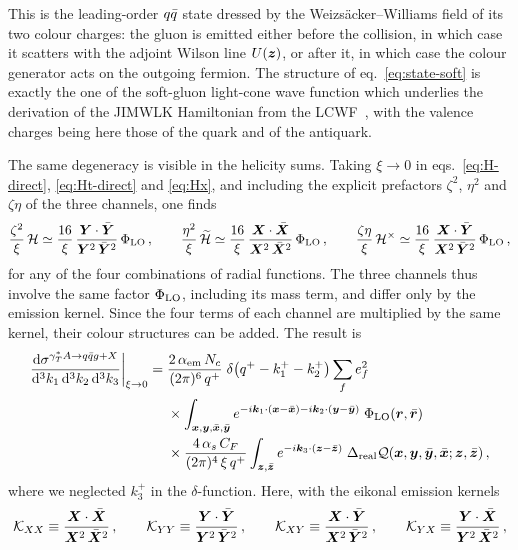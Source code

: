 This is the leading-order $q\bar q$ state dressed by the Weizs\"acker--Williams field of its two colour
charges: the gluon is emitted either before the collision, in which case it scatters with the adjoint
Wilson line $U(\bm{z})$, or after it, in which case the colour generator acts on the outgoing fermion. The
structure of eq.~\eqref{eq:state-soft} is exactly the one of the soft-gluon light-cone wave function
which underlies the derivation of the JIMWLK Hamiltonian from the
LCWF~\cite{Kovner:2000pt,Lublinsky:2016meo,Radhakrishnan:2026}, with the valence charges being here
those of the quark and of the antiquark.

The same degeneracy is visible in the helicity sums. Taking $\xi\to0$ in eqs.~\eqref{eq:H-direct},
\eqref{eq:Ht-direct} and \eqref{eq:Hx}, and including the explicit prefactors $\zeta^2$, $\eta^2$ and
$\zeta\eta$ of the three channels, one finds
\begin{equation}
\frac{\zeta^2}{\xi}\,\mathcal{H}\simeq\frac{16}{\xi}\,\frac{\bm{Y}\cdot\bar{\bm{Y}}}{\bm{Y}^2\,\bar{\bm{Y}}^2}\,\Phi_{\rm LO}\,,\qquad
\frac{\eta^2}{\xi}\,\widetilde{\mathcal{H}}\simeq\frac{16}{\xi}\,\frac{\bm{X}\cdot\bar{\bm{X}}}{\bm{X}^2\,\bar{\bm{X}}^2}\,\Phi_{\rm LO}\,,\qquad
\frac{\zeta\eta}{\xi}\,\mathcal{H}^\times\simeq\frac{16}{\xi}\,\frac{\bm{X}\cdot\bar{\bm{Y}}}{\bm{X}^2\,\bar{\bm{Y}}^2}\,\Phi_{\rm LO}\,,
\label{eq:soft-weights}
\end{equation}
for any of the four combinations of radial functions. The three channels thus involve the same factor
$\Phi_{\rm LO}$, including its mass term, and differ only by the emission kernel. Since the four terms
of each channel are multiplied by the same kernel, their colour structures can be added. The result is
\begin{align}
\frac{{\rm d}\sigma^{\gamma^{*}_{T} A\to q\bar q g+X}}{{\rm d}^3k_1\,{\rm d}^3k_2\,{\rm d}^3k_3}\bigg|_{\xi\to0}={}&
\frac{2\,\alpha_{\rm em}\,N_c}{(2\pi)^6\,q^+}\;\delta\big(q^+-k_1^+-k_2^+\big)\sum_fe_f^2
\nonumber\\
&\times\int_{\bm{x},\bm{y},\bar{\bm{x}},\bar{\bm{y}}}e^{-i\bm{k}_1\cdot(\bm{x}-\bar{\bm{x}})-i\bm{k}_2\cdot(\bm{y}-\bar{\bm{y}})}\;\Phi_{\rm LO}(\bm r,\bar{\bm r})
\nonumber\\
&\times\frac{4\,\alpha_s\,C_F}{(2\pi)^4\,\xi\,q^+}\int_{\bm{z},\bar{\bm{z}}}e^{-i\bm{k}_3\cdot(\bm{z}-\bar{\bm{z}})}\;
\Delta_{\rm real}\mathcal{Q}(\bm{x},\bm{y},\bar{\bm{y}},\bar{\bm{x}};\bm{z},\bar{\bm{z}})\,,
\label{eq:xs-soft}
\end{align}
where we neglected $k_3^+$ in the $\delta$-function. Here, with the eikonal emission kernels
\begin{equation}
\mathcal{K}_{XX}\equiv\frac{\bm{X}\cdot\bar{\bm{X}}}{\bm{X}^2\,\bar{\bm{X}}^2}\,,\qquad
\mathcal{K}_{YY}\equiv\frac{\bm{Y}\cdot\bar{\bm{Y}}}{\bm{Y}^2\,\bar{\bm{Y}}^2}\,,\qquad
\mathcal{K}_{XY}\equiv\frac{\bm{X}\cdot\bar{\bm{Y}}}{\bm{X}^2\,\bar{\bm{Y}}^2}\,,\qquad
\mathcal{K}_{YX}\equiv\frac{\bm{Y}\cdot\bar{\bm{X}}}{\bm{Y}^2\,\bar{\bm{X}}^2}\,,
\label{eq:kernels}
\end{equation}
